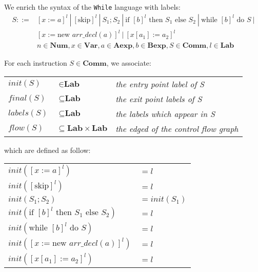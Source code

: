 \documentclass{article}
\begin{document}
We enrich the syntax of the \texttt{While} language with labels:
\begin{equation*} \label{eq1}
\begin{split}
S::= & [x := a]^l
     \ |\ [\text{skip}]^l
     \ |\ S_1;S_2
     \ |\ \text{if } [b]^l \text{ then } S_1 \text{ else } S_2 
     \ |\ \text{while } [b]^l \text{ do } S \ |\\
     & [x := \text{new } arr\_decl(a)]^l
     \ |\ [x[a_1] := a_2]^l\\
& n \in \textbf{Num}, x \in \textbf{Var}, a \in \textbf{Aexp}, b \in \textbf{Bexp}, S \in \textbf{Comm}, l \in \textbf{Lab}
\end{split}
\end{equation*}

For each instruction \(S \in \textbf{Comm}\), we associate:
\begin{center}
\begin{tabular}{ l l l }
\(init(S)\) & \(\in \textbf{Lab}\) &  \textit{the entry point label of S}\\
\(final(S)\) & \(\subseteq \textbf{Lab}\) &  \textit{the exit point labels of S}\\
\(labels(S)\) & \(\subseteq \textbf{Lab}\) &  \textit{the labels which appear in S}\\
\(flow(S)\) & \(\subseteq \textbf{Lab} \times \textbf{Lab}\) &  \textit{the edged of the control flow graph}
\end{tabular}
\end{center}
which are defined as follow:
\begin{center}
\begin{tabular}{ l l }
\( init([x := a]^l) \)                                           & \( = l\)\\
\( init([\text{skip}]^l) \)                                      & \( = l\)\\
\( init(S_1;S_2) \)                                              & \( = init(S_1)\)\\
\( init(\text{if } [b]^l \text{ then } S_1 \text{ else } S_2) \) & \( = l\)\\
\( init(\text{while } [b]^l \text{ do } S) \)                    & \( = l\)\\
\( init([x := \text{new } arr\_decl(a)]^l) \)                    & \( = l\)\\
\( init([x[a_1] := a_2]^l) \)                                    & \( = l\)
\end{tabular}
\end{center}
\end{document}
